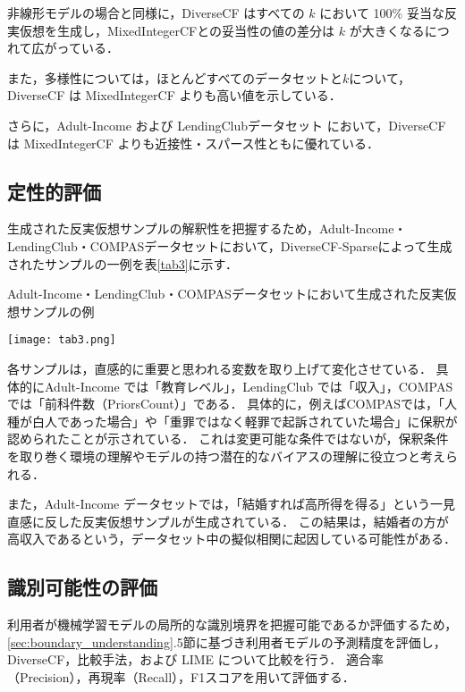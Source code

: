 \documentclass[dvipdfmx]{jreport}
\begin{document}
非線形モデルの場合と同様に，DiverseCF はすべての $k$ において 100\% 妥当な反実仮想を生成し，MixedIntegerCFとの妥当性の値の差分は $k$ が大きくなるにつれて広がっている．

また，多様性については，ほとんどすべてのデータセットと$k$について，DiverseCF は MixedIntegerCF よりも高い値を示している．

さらに，Adult-Income および LendingClubデータセット において，DiverseCF は MixedIntegerCF よりも近接性・スパース性ともに優れている．


\subsection{定性的評価}
生成された反実仮想サンプルの解釈性を把握するため，Adult-Income・LendingClub・COMPASデータセットにおいて，DiverseCF-Sparseによって生成されたサンプルの一例を表\ref{tab3}に示す．
\begin{table}[h]
    \begin{center}
        \caption{Adult-Income・LendingClub・COMPASデータセットにおいて生成された反実仮想サンプルの例} \label{tab3}
        \texttt{[image: tab3.png]} 
    \end{center}
\end{table}

\newpage
各サンプルは，直感的に重要と思われる変数を取り上げて変化させている．
具体的にAdult-Income では「教育レベル」，LendingClub では「収入」，COMPAS では「前科件数（PriorsCount）」である．
具体的に，例えばCOMPASでは，「人種が白人であった場合」や「重罪ではなく軽罪で起訴されていた場合」に保釈が認められたことが示されている．
これは変更可能な条件ではないが，保釈条件を取り巻く環境の理解やモデルの持つ潜在的なバイアスの理解に役立つと考えられる．

また，Adult-Income データセットでは，「結婚すれば高所得を得る」という一見直感に反した反実仮想サンプルが生成されている．
この結果は，結婚者の方が高収入であるという，データセット中の擬似相関に起因している可能性がある．



\subsection{識別可能性の評価}
利用者が機械学習モデルの局所的な識別境界を把握可能であるか評価するため，\ref{sec:boundary_understanding}.5節に基づき利用者モデルの予測精度を評価し，DiverseCF，比較手法，および LIME について比較を行う．
適合率（Precision），再現率（Recall），F1スコアを用いて評価する．
\end{document}
